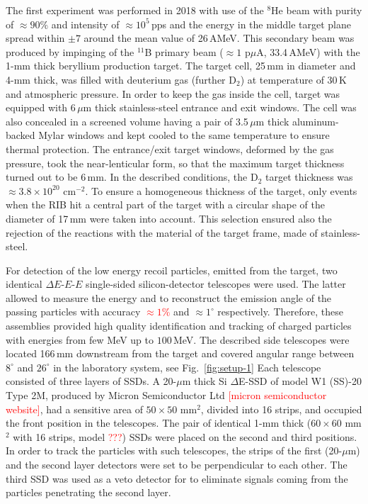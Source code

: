 The first experiment was performed in 2018 with use of the $^{8}$He beam with purity of $\approx90\%$ and intensity of $\approx10^{5}$\,pps and the energy in the middle target plane spread within $\pm7$ around the mean value of 26\,AMeV.
This secondary beam was produced by impinging of the $^{11}$B primary beam ($\approx 1$ p$\mu$A, 33.4\,AMeV) with  the 1-mm thick beryllium production target.
The target cell, 25\,mm in diameter and 4-mm thick, was filled with deuterium gas (further D$_{2}$) at temperature of 30\,K and atmospheric pressure. 
In order to keep the gas inside the cell, target was equipped with 6\,$\mu$m thick stainless-steel entrance and exit windows.
The cell was also concealed in a screened volume having a pair of 3.5\,$\mu$m thick aluminum-backed Mylar windows and kept cooled to the same temperature to ensure thermal protection.
The entrance/exit target windows, deformed by the gas pressure, took the near-lenticular form, so that the maximum target thickness turned out to be 6\,mm.
In the described conditions, the D$_{2}$ target thickness was $\approx 3.8 \times 10 ^{20}$ cm$^{-2}$.
To ensure a homogeneous thickness of the target, only events when the RIB hit a central part of the target with a circular shape of the diameter of 17\,mm were taken into account.
This selection ensured also the rejection of the reactions with the material of the target frame, made of stainless-steel.

For detection of the low energy recoil particles, emitted from the target, two identical $\Delta E$-$E$-$E$ single-sided silicon-detector telescopes were used. 
The latter allowed to measure the energy and to reconstruct the emission angle of the passing particles with accuracy \textcolor{red}{$\approx1\%$} and $\approx1^{\circ}$ respectively.
Therefore, these assemblies provided high quality identification and tracking of charged particles with energies from few MeV up to $100$\,MeV.
The described side telescopes were located 166\,mm downstream from the target and covered angular range between $8^{\circ}$ and $26^{\circ}$ in the laboratory system, see Fig.\ \ref{fig:setup-1} 
Each telescope consisted of three layers of SSDs. 
A 20-$\mu$m thick Si $\Delta$E-SSD of model W1 (SS)-20 Type 2M, produced by Micron Semiconductor Ltd \textcolor{red}{[micron semiconductor website]}, had a sensitive area of $50 \times 50$ mm$^2$, divided into 16 strips, and occupied the front position in the telescopes.
The pair of identical 1-mm thick ($60 \times 60$ mm$^2$ with 16 strips, model \textcolor{red}{???}) SSDs were placed on the second and third positions.
In order to track the particles with such telescopes, the strips of the first (20-$\mu$m) and the second layer detectors were set to be perpendicular to each other. 
The third SSD was used as a veto detector for to eliminate signals coming from the particles penetrating the second layer.

